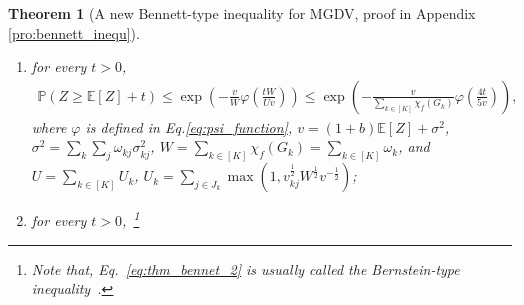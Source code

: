 \documentclass{article}
\def\eE{\mathbb{E}}
\def\pP{\mathbb{P}}
\def\defeq{\overset{\textup{def}}{=}}
\newtheorem{theorem}{Theorem}
\begin{document}
\begin{theorem}[A new Bennett-type inequality for MGDV, proof in Appendix \ref{pro:bennett_inequ}]
        \begin{enumerate}[(1)]
            \item for every $t > 0$,
                \begin{align}
                \label{eq:thm_bennet_1}
                    \pP (Z \geq \eE[Z]  + t) \leq \exp \left( -\frac{v}{W} \varphi \left( \frac{tW}{Uv}\right) \right) 
                    \leq \exp  \left( - \frac{v}{ \sum_{k \in [K]} \chi_{f} (G_k)} \varphi \left( \frac{4t}{5v}\right) \right) ,
                \end{align}
            where $\varphi$ is defined in Eq.\eqref{eq:psi_function}, $v = (1 + b) \eE [Z] + \sigma^2$, $\sigma^2 = \sum_k \sum_j \omega_{kj} \sigma_{kj}^2$, $W = \sum_{k \in [K]} \chi_f(G_k) = \sum_{k \in [K]} \omega_k$, and $U = \sum_{k \in [K]} U_k$, $U_k = \sum_{j \in J_k} \max (1, v_{kj}^{\frac{1}{2}} W^{\frac{1}{2}} v^{-\frac{1}{2}})$; 
            \item for every $t > 0$,~\footnote{Note that, Eq.~\eqref{eq:thm_bennet_2} is usually called the Bernstein-type inequality~\cite{concentration13initial}.}

\end{enumerate}
\end{theorem}
\end{document}
